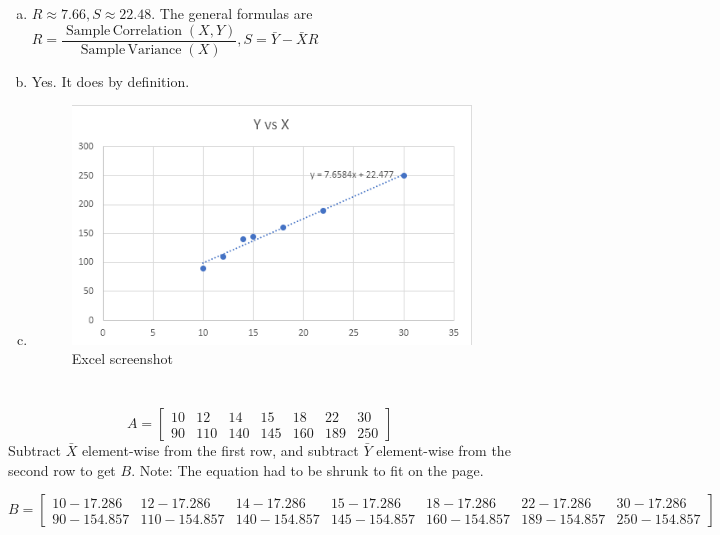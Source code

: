 \documentclass[12pt]{article}
\begin{document}
\newpage

\section{} %
\begin{enumerate}[(a)]
	\item $ R \approx 7.66, S \approx 22.48 $. The general formulas are $ R = \dfrac{\operatorname{Sample\,Correlation}(X, Y)}{\operatorname{Sample\,Variance}(X)}, S = \bar{Y} - \bar{X}R $
	
	\item Yes. It does by definition.
	
	\item 
		\begin{figure}[H]
			\centering
			\includegraphics[width=\linewidth]{images/4c.png}
			\caption{Excel screenshot}
			\label{fig:4:c}
		\end{figure}
\end{enumerate}

\newpage

\section{} %
\[A = 
\begin{bmatrix}
	10 & 12 & 14 & 15 & 18 & 22 & 30\\
	90 & 110 & 140 & 145 & 160 & 189 & 250
\end{bmatrix}
\]
Subtract $ \bar{X} $ element-wise from the first row, and subtract $ \bar{Y} $ element-wise from the second row to get $ B $.
Note: The equation had to be shrunk to fit on the page.
\begin{tiny}
	\[B =
	\begin{bmatrix}
		10 - 17.286 & 12 - 17.286 & 14 - 17.286 & 15 - 17.286 & 18 - 17.286 & 22 - 17.286 & 30 - 17.286\\
		90 - 154.857 & 110 - 154.857 & 140 - 154.857 & 145 - 154.857 & 160 - 154.857 & 189 - 154.857 & 250 - 154.857
	\end{bmatrix}
	\]
\end{tiny}
\end{document}
